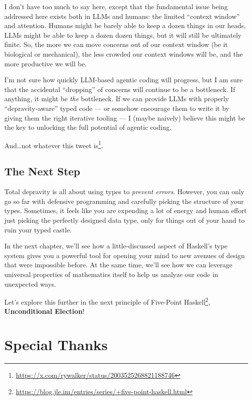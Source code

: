 \documentclass[]{article}
\renewcommand{\href}[2]{#2\footnote{\url{#1}}}
\begin{document}
I don't have too much to say here, except that the fundamental issue being
addressed here exists both in LLMs and humans: the limited ``context window''
and attention. Humans might be barely able to keep a dozen things in our heads,
LLMs might be able to keep a dozen dozen things, but it will still be ultimately
finite. So, the more we can move concerns out of our context window (be it
biological or mechanical), the less crowded our context windows will be, and the
more productive we will be.

I'm not sure how quickly LLM-based agentic coding will progress, but I am sure
that the accidental ``dropping'' of concerns will continue to be a bottleneck.
If anything, it might be \emph{the} bottleneck. If we can provide LLMs with
properly ``depravity-aware'' typed code --- or somehow encourage them to write
it by giving them the right iterative tooling --- I (maybe naively) believe this
might be the key to unlocking the full potential of agentic coding.

And\ldots not whatever
\href{https://x.com/rywalker/status/2003525268821188746}{this tweet is}.

\subsection{The Next Step}\label{the-next-step}

Total depravity is all about using types to \emph{prevent errors}. However, you
can only go so far with defensive programming and carefully picking the
structure of your types. Sometimes, it feels like you are expending a lot of
energy and human effort just picking the perfectly designed data type, only for
things out of your hand to ruin your typed castle.

In the next chapter, we'll see how a little-discussed aspect of Haskell's type
system gives you a powerful tool for opening your mind to new avenues of design
that were impossible before. At the same time, we'll see how we can leverage
universal properties of mathematics itself to help us analyze our code in
unexpected ways.

Let's explore this further in the next principle of
\href{https://blog.jle.im/entries/series/+five-point-haskell.html}{Five-Point
Haskell}, \textbf{Unconditional Election}!

\section{Special Thanks}\label{special-thanks}
\end{document}

